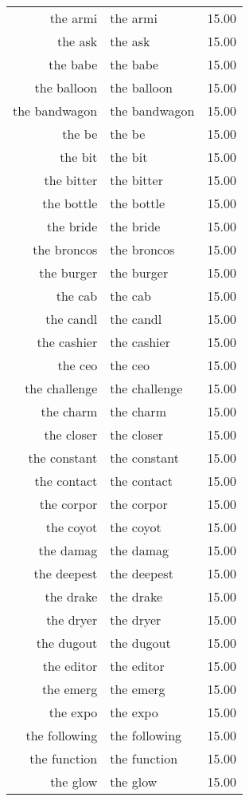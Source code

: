 \begin{table}[ht]
\begin{tabular}{rlr}
  the armi & the armi & 15.00 \\ 
  the ask & the ask & 15.00 \\ 
  the babe & the babe & 15.00 \\ 
  the balloon & the balloon & 15.00 \\ 
  the bandwagon & the bandwagon & 15.00 \\ 
  the be & the be & 15.00 \\ 
  the bit & the bit & 15.00 \\ 
  the bitter & the bitter & 15.00 \\ 
  the bottle & the bottle & 15.00 \\ 
  the bride & the bride & 15.00 \\ 
  the broncos & the broncos & 15.00 \\ 
  the burger & the burger & 15.00 \\ 
  the cab & the cab & 15.00 \\ 
  the candl & the candl & 15.00 \\ 
  the cashier & the cashier & 15.00 \\ 
  the ceo & the ceo & 15.00 \\ 
  the challenge & the challenge & 15.00 \\ 
  the charm & the charm & 15.00 \\ 
  the closer & the closer & 15.00 \\ 
  the constant & the constant & 15.00 \\ 
  the contact & the contact & 15.00 \\ 
  the corpor & the corpor & 15.00 \\ 
  the coyot & the coyot & 15.00 \\ 
  the damag & the damag & 15.00 \\ 
  the deepest & the deepest & 15.00 \\ 
  the drake & the drake & 15.00 \\ 
  the dryer & the dryer & 15.00 \\ 
  the dugout & the dugout & 15.00 \\ 
  the editor & the editor & 15.00 \\ 
  the emerg & the emerg & 15.00 \\ 
  the expo & the expo & 15.00 \\ 
  the following & the following & 15.00 \\ 
  the function & the function & 15.00 \\ 
  the glow & the glow & 15.00 \\ 

\end{tabular}
\end{table}
